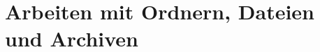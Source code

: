 \documentclass[12pt,utf8]{beamer}
\begin{document}

\section{Arbeiten mit Ordnern, Dateien und Archiven}
\end{document}
